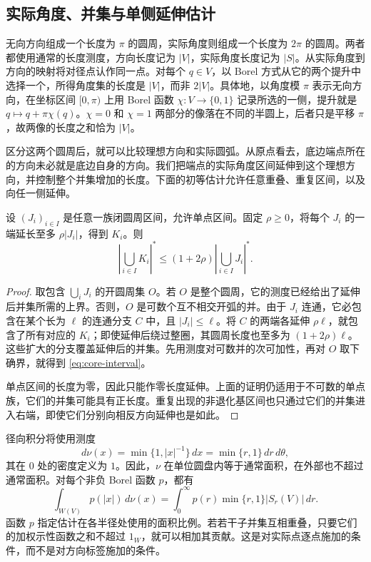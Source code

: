 \subsection{实际角度、并集与单侧延伸估计}
\label{subsec:core-intervals}

无向方向组成一个长度为 $\pi$ 的圆周，实际角度则组成一个长度为 $2\pi$ 的圆周。两者都使用通常的长度测度，方向长度记为 $|V|$，实际角度长度记为 $|S|$。从实际角度到方向的映射将对径点认作同一点。对每个 $q\in V$，以 Borel 方式从它的两个提升中选择一个，所得角度集的长度是 $|V|$，而非 $2|V|$。具体地，以角度模 $\pi$ 表示无向方向，在坐标区间 $[0,\pi)$ 上用 Borel 函数 $\chi:V\to\{0,1\}$ 记录所选的一侧，提升就是 $q\mapsto q+\pi\chi(q)$。$\chi=0$ 和 $\chi=1$ 两部分的像落在不同的半圆上，后者只是平移 $\pi$，故两像的长度之和恰为 $|V|$。

区分这两个圆周后，就可以比较理想方向和实际圆弧。从原点看去，底边端点所在的方向未必就是底边自身的方向。我们把端点的实际角度区间延伸到这个理想方向，并控制整个并集增加的长度。下面的初等估计允许任意重叠、重复区间，以及向任一侧延伸。

\begin{lemma}[并集的单侧延伸]
\label{lem:core-interval}
设 $(J_i)_{i\in I}$ 是任意一族闭圆周区间，允许单点区间。固定 $\rho\geq0$，将每个 $J_i$ 的一端延长至多 $\rho|J_i|$，得到 $K_i$。则
\begin{equation}
 \left|\bigcup_{i\in I}K_i\right|^*
       \leq(1+2\rho)\left|\bigcup_{i\in I}J_i\right|^*.
\label{eq:core-interval}
\end{equation}
\end{lemma}

\begin{proof}
取包含 $\bigcup_iJ_i$ 的开圆周集 $O$。若 $O$ 是整个圆周，它的测度已经给出了延伸后并集所需的上界。否则，$O$ 是可数个互不相交开弧的并。由于 $J_i$ 连通，它必包含在某个长为 $\ell$ 的连通分支 $C$ 中，且 $|J_i|\leq\ell$。将 $C$ 的两端各延伸 $\rho\ell$，就包含了所有对应的 $K_i$；即使延伸后绕过整圈，其圆周长度也至多为 $(1+2\rho)\ell$。这些扩大的分支覆盖延伸后的并集。先用测度对可数并的次可加性，再对 $O$ 取下确界，就得到 \eqref{eq:core-interval}。

单点区间的长度为零，因此只能作零长度延伸。上面的证明仍适用于不可数的单点族，它们的并集可能具有正长度。重复出现的非退化基区间也只通过它们的并集进入右端，即使它们分别向相反方向延伸也是如此。
\end{proof}

径向积分将使用测度
\begin{equation}
 d\nu(x)=\min\{1,|x|^{-1}\}\,dx
        =\min\{r,1\}\,dr\,d\theta,
\label{eq:core-nu}
\end{equation}
其在 $0$ 处的密度定义为 $1$。因此，$\nu$ 在单位圆盘内等于通常面积，在外部也不超过通常面积。对每个非负 Borel 函数 $p$，都有
\begin{equation}
 \int_{W(V)}p(|x|)\,d\nu(x)
     =\int_0^\infty p(r)\min\{r,1\}|S_r(V)|\,dr.
\label{eq:core-polar}
\end{equation}
函数 $p$ 指定估计在各半径处使用的面积比例。若若干子并集互相重叠，只要它们的加权示性函数之和不超过 $1_W$，就可以相加其贡献。这是对实际点逐点施加的条件，而不是对方向标签施加的条件。

